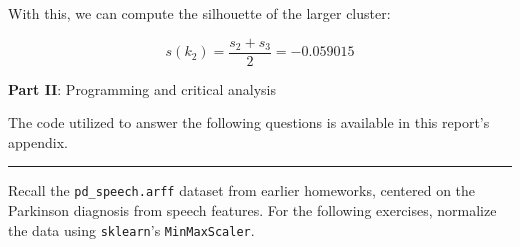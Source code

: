 \documentclass[12pt]{article}
\begin{document}
\begin{enumerate}[leftmargin=\labelsep]
\begin{enumerate}[leftmargin=\labelsep]
\begin{paracol}{2}
                \end{paracol}

                \vspace*{0.5cm}

                With this, we can compute the silhouette of the larger cluster:

                \begin{equation*}
                  s(k_2) = \frac{s_2 + s_3}{2} = -0.059015
                \end{equation*}


        \end{enumerate}

\end{enumerate}

\pagebreak

\center\large{\textbf{Part II}: Programming and critical analysis}

\begin{justify}
  The code utilized to answer the following questions is available in this
  report's appendix.
\end{justify}

\hrule \vspace*{0.5cm}

Recall the \texttt{pd\_speech.arff} dataset from earlier homeworks, centered on
the Parkinson diagnosis from speech features. For the following exercises, normalize
the data using \texttt{sklearn}'s \texttt{MinMaxScaler}.
\end{document}

